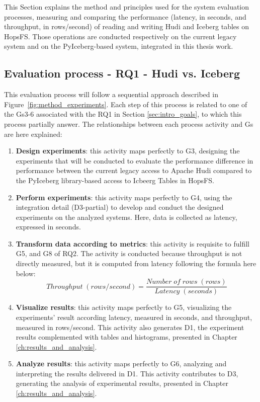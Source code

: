 This Section explains the method and principles used for the system evaluation processes, measuring and comparing the performance (latency, in seconds, and throughput, in rows/second) of reading and writing Hudi and Iceberg tables on \gls{HopsFS}. Those operations are conducted respectively on the current legacy system and on the PyIceberg-based system, integrated in this thesis work.

\subsection{Evaluation process - RQ1 - Hudi vs. Iceberg}
\label{subsec:eval_process_hudi_iceberg}
This evaluation process will follow a sequential approach described in Figure~\ref{fig:method_experiments}. Each step of this process is related to one of the \glspl{G}3-6 associated with the \gls{RQ}1 in Section \ref{sec:intro_goals}, to which this process partially answer. The relationships between each process activity and \glspl{G} are here explained:
\begin{enumerate}
    \item \textbf{Design experiments}: this activity maps perfectly to \gls{G}3, designing the experiments that will be conducted to evaluate the performance difference in performance between the current legacy access to Apache Hudi compared to the PyIceberg library-based access to Icbeerg Tables in \gls{HopsFS}. 
    \item \textbf{Perform experiments}: this activity maps perfectly to \gls{G}4, using the integration detail (\gls{D}3-partial) to develop and conduct the designed experiments on the analyzed systems. Here, data is collected as latency, expressed in seconds.
    \item \textbf{Transform data according to metrics}: this activity is requisite to fulfill \gls{G}5, and \gls{G}8 of \gls{RQ}2. The activity is conducted because throughput is not directly measured, but it is computed from latency following the formula here below:
    \[ Throughput \; (rows/second) = \frac{Number \; of \; rows \; (rows)}{Latency \;(seconds)}\]
    \item \textbf{Visualize results}: this activity maps perfectly to \gls{G}5, visualizing the experiments' result according latency, measured in seconds, and throughput, measured in rows/second. This activity also generates \gls{D}1, the experiment results complemented with tables and histograms, presented in Chapter \ref{ch:results_and_analysis}.
    \item \textbf{Analyze results}: this activity maps perfectly to \gls{G}6, analyzing and interpreting the results delivered in \gls{D}1. This activity contributes to \gls{D}3, generating the analysis of experimental results, presented in Chapter \ref{ch:results_and_analysis}.
\end{enumerate}
